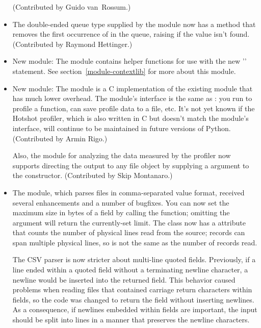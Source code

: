 \documentclass{howto}
\begin{document}
\begin{itemize}
(Contributed by Guido van~Rossum.)

\item The  double-ended queue type supplied by the
 module now has a 
method that removes the first occurrence of  in the queue,
raising  if the value isn't found.
(Contributed by Raymond Hettinger.)

\item New module: The  module contains helper functions for use 
with the new '' statement.  See
section~\ref{module-contextlib} for more about this module.

\item New module: The  module is a C implementation of 
the existing  module that has much lower overhead.
The module's interface is the same as : you run
 to profile a function, can save profile
data to a file, etc.  It's not yet known if the Hotshot profiler,
which is also written in C but doesn't match the 
module's interface, will continue to be maintained in future versions
of Python.  (Contributed by Armin Rigo.)

Also, the  module for analyzing the data measured by
the profiler now supports directing the output to any file object
by supplying a  argument to the  constructor.
(Contributed by Skip Montanaro.)

\item The  module, which parses files in
comma-separated value format, received several enhancements and a
number of bugfixes.  You can now set the maximum size in bytes of a
field by calling the 
function; omitting the  argument will return the
currently-set limit.  The  class now has a
 attribute that counts the number of physical lines
read from the source; records can span multiple physical lines, so
 is not the same as the number of records read.

The CSV parser is now stricter about multi-line quoted
fields. Previously, if a line ended within a quoted field without a
terminating newline character, a newline would be inserted into the
returned field. This behavior caused problems when reading files that
contained carriage return characters within fields, so the code was
changed to return the field without inserting newlines. As a
consequence, if newlines embedded within fields are important, the
input should be split into lines in a manner that preserves the
newline characters.


\end{itemize}
\end{document}
